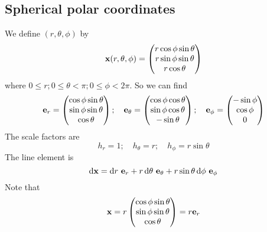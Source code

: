 \subsection{Spherical polar coordinates}
We define \((r, \theta, \phi)\) by
\[
	\vb x(r, \theta, \phi) = \begin{pmatrix}
		r \cos \phi \sin \theta \\
		r \sin \phi \sin \theta \\
		r \cos \theta
	\end{pmatrix}
\]
where \(0 \leq r; 0 \leq \theta < \pi; 0 \leq \phi < 2 \pi\).
So we can find
\[
	\vb e_r = \begin{pmatrix}
		\cos \phi \sin \theta \\ \sin \phi \sin \theta \\ \cos \theta
	\end{pmatrix};\quad \vb e_\theta = \begin{pmatrix}
		\cos \phi \cos \theta \\ \sin \phi \cos \theta \\ -\sin \theta
	\end{pmatrix};\quad \vb e_\phi = \begin{pmatrix}
		-\sin \phi \\ \cos \phi \\ 0
	\end{pmatrix}
\]
The scale factors are
\[
	h_r = 1;\quad h_\theta = r;\quad h_\phi = r \sin \theta
\]
The line element is
\[
	\dd \vb x = \dd{r} \, \vb e_r + r \dd{\theta} \, \vb e_\theta + r \sin \theta \dd{\phi} \, \vb e_\phi
\]
Note that
\[
	\vb x = r \begin{pmatrix}
		\cos \phi \sin \theta \\ \sin \phi \sin \theta \\ \cos \theta
	\end{pmatrix} = r \vb e_r
\]

